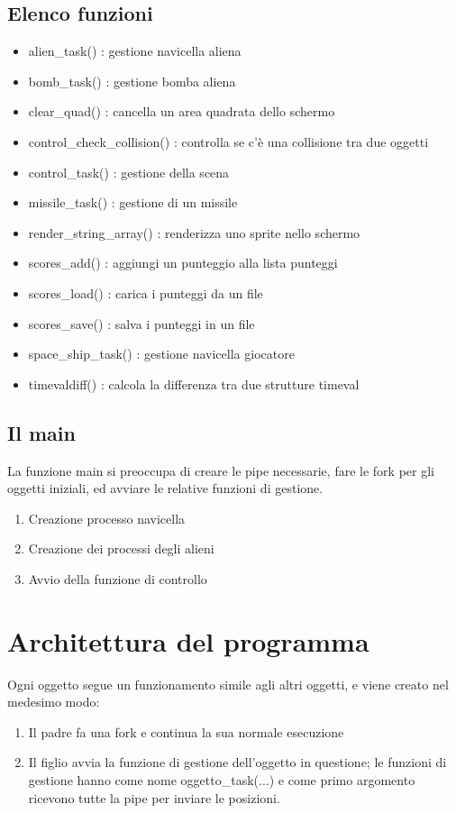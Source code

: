 \documentclass[a4paper,11pt]{report}
\begin{document}
\section{Elenco funzioni}
\begin{itemize}
  \item alien_task() : gestione navicella aliena
  \item bomb_task() : gestione bomba aliena
  \item clear_quad() : cancella un area quadrata dello schermo
  \item control_check_collision() : controlla se c'è una collisione tra due oggetti
  \item control_task() : gestione della scena
  \item missile_task() : gestione di un missile
  \item render_string_array() : renderizza uno sprite nello schermo
  \item scores_add() : aggiungi un punteggio alla lista punteggi
  \item scores_load() : carica i punteggi da un file
  \item scores_save() : salva i punteggi in un file
  \item space_ship_task() : gestione navicella giocatore
  \item timevaldiff() : calcola la differenza tra due strutture timeval
\end{itemize}


\section{Il main}
La funzione main si preoccupa di creare le pipe necessarie, fare le fork per gli oggetti iniziali, ed avviare 
le relative funzioni di gestione.

\begin{enumerate}
  \item Creazione processo navicella
  \item Creazione dei processi degli alieni
  \item Avvio della funzione di controllo
\end{enumerate}




\chapter{Architettura del programma}

Ogni oggetto segue un funzionamento simile agli altri oggetti, e viene creato nel medesimo modo:
\begin{enumerate}
   \item Il padre fa una fork e continua la sua normale esecuzione
   \item Il figlio avvia la funzione di gestione dell'oggetto in questione; le funzioni di gestione
      hanno come nome oggetto_task(...) e come primo argomento ricevono tutte la pipe per inviare
      le posizioni.
 \end{enumerate} 
\end{document}
